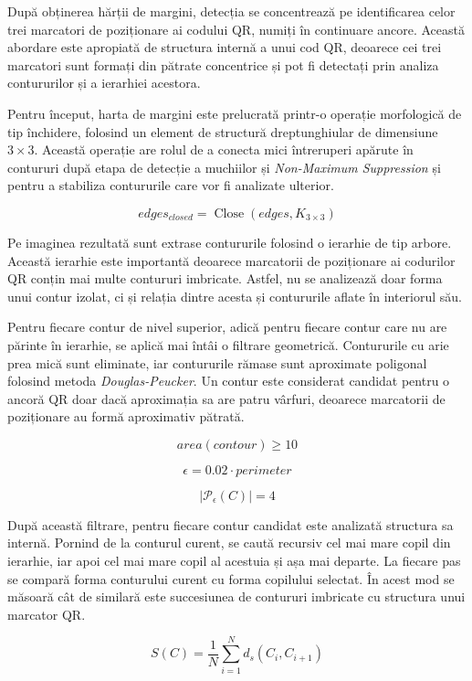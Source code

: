 După obținerea hărții de margini, detecția se concentrează pe identificarea celor trei marcatori de poziționare ai codului QR, numiți în continuare ancore. Această abordare este apropiată de structura internă a unui cod QR, deoarece cei trei marcatori sunt formați din pătrate concentrice și pot fi detectați prin analiza contururilor și a ierarhiei acestora.

Pentru început, harta de margini este prelucrată printr-o operație morfologică de tip închidere, folosind un element de structură dreptunghiular de dimensiune $3 \times 3$. Această operație are rolul de a conecta mici întreruperi apărute în contururi după etapa de detecție a muchiilor și \textit{Non-Maximum Suppression} și pentru a stabiliza contururile care vor fi analizate ulterior.

\[
    edges_{closed} = \operatorname{Close}(edges, K_{3 \times 3})
\]

Pe imaginea rezultată sunt extrase contururile folosind o ierarhie de tip arbore. Această ierarhie este importantă deoarece marcatorii de poziționare ai codurilor QR conțin mai multe contururi imbricate. Astfel, nu se analizează doar forma unui contur izolat, ci și relația dintre acesta și contururile aflate în interiorul său.

Pentru fiecare contur de nivel superior, adică pentru fiecare contur care nu are părinte în ierarhie, se aplică mai întâi o filtrare geometrică. Contururile cu arie prea mică sunt eliminate, iar contururile rămase sunt aproximate poligonal folosind metoda \textit{Douglas-Peucker}. Un contur este considerat candidat pentru o ancoră QR doar dacă aproximația sa are patru vârfuri, deoarece marcatorii de poziționare au formă aproximativ pătrată.

\[
    area(contour) \geq 10
\]

\[
    \epsilon = 0.02 \cdot perimeter
\]

\[
    \left|\mathcal{P}_{\epsilon}(C)\right| = 4
\]

După această filtrare, pentru fiecare contur candidat este analizată structura sa internă. Pornind de la conturul curent, se caută recursiv cel mai mare copil din ierarhie, iar apoi cel mai mare copil al acestuia și așa mai departe. La fiecare pas se compară forma conturului curent cu forma copilului selectat. În acest mod se măsoară cât de similară este succesiunea de contururi imbricate cu structura unui marcator QR.

\[
S(C) = \frac{1}{N}\sum_{i=1}^{N} d_s(C_i, C_{i+1})
\]

